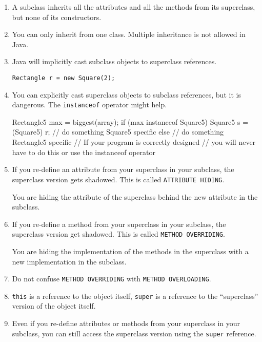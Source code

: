 \documentclass[a4paper, 9pt]{extarticle}
\begin{document}
\begin{enumerate}

  \item A subclass inherits all the attributes and all the methods from its
    superclass, but none of its constructors.

  \item You can only inherit from one class. Multiple inheritance is not
    allowed in Java.

  \item Java will implicitly cast subclass objects to superclass references.

    \verb+Rectangle r = new Square(2);+

  \item You can explicitly cast superclass objects to subclass references, but
    it is dangerous. The \verb+instanceof+ operator might help.

\begin{blackboard}
Rectangle5 max = biggest(array);
if (max instanceof Square5) {
  Square5 s = (Square5) r;
  // do something Square5 specific
} else {
  // do something Rectangle5 specific
}
// If your program is correctly designed
// you will never have to do this or use the instanceof operator
\end{blackboard}

  \item If you re-define an attribute from your superclass in your subclass,
    the superclass version gets shadowed. This is called \verb+ATTRIBUTE HIDING+.

    You are hiding the attribute of the
    superclass behind the new attribute in the subclass.

  \item If you re-define a method from your superclass in your subclass, the
    superclass version get shadowed. This is called \verb+METHOD OVERRIDING+.

    You are hiding the implementation of the methods in the superclass with a
    new implementation in the subclass.

  \item Do not confuse \verb+METHOD OVERRIDING+ with \verb+METHOD OVERLOADING+.

  \item \verb+this+ is a reference to the object itself, \verb+super+ is a
    reference to the ``superclass'' version of the object itself.

  \item Even if you re-define attributes or methods from your superclass in
    your subclass, you can still access the superclass version using the
    \verb+super+ reference.


\end{enumerate}
\end{document}
